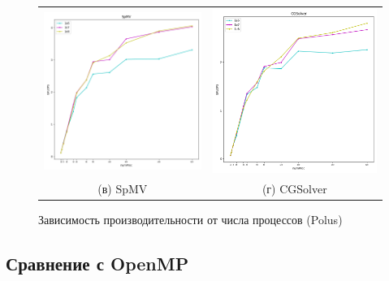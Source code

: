 \documentclass[12pt, a4paper]{article}
\begin{document}
\begin{figure}[H]
\begin{tabular}{cc}
		\includegraphics[width=85mm]{mpi_polus_spmv} & \includegraphics[width=85mm]{mpi_polus_cgsolver} \\
		(в) SpMV & (г) CGSolver \\[6pt]
	\end{tabular}
	\caption{Зависимость производительности от числа процессов (Polus)}
	\label{fig:mpi_flops_polus} 
\end{figure}

\newpage

\subsection{Сравнение с OpenMP}
\end{document}
